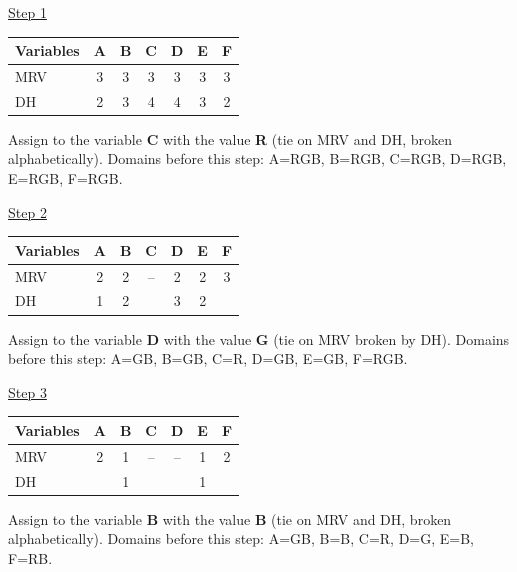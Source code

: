 \documentclass[11pt,a4paper]{article}
\begin{document}
\begin{solbox}
\par \underline{Step 1}\par\begin{center}\small \begin{tabular}{|l|c|c|c|c|c|c|}\hline Variables & \textbf{A} & \textbf{B} & \textbf{C} & \textbf{D} & \textbf{E} & \textbf{F}\\ \hline MRV & \textcolor{blue!60!black}{3} & \textcolor{blue!60!black}{3} & \textcolor{blue!60!black}{3} & \textcolor{blue!60!black}{3} & \textcolor{blue!60!black}{3} & \textcolor{blue!60!black}{3}\\ \hline DH & \textcolor{blue!60!black}{2} & \textcolor{blue!60!black}{3} & \textcolor{blue!60!black}{4} & \textcolor{blue!60!black}{4} & \textcolor{blue!60!black}{3} & \textcolor{blue!60!black}{2}\\ \hline\end{tabular}\end{center}Assign to the variable \textbf{C} with the value \textbf{R} (tie on MRV and DH, broken alphabetically). Domains before this step: A=RGB, B=RGB, C=RGB, D=RGB, E=RGB, F=RGB.\par
\underline{Step 2}\par\begin{center}\small \begin{tabular}{|l|c|c|c|c|c|c|}\hline Variables & \textbf{A} & \textbf{B} & \textbf{C} & \textbf{D} & \textbf{E} & \textbf{F}\\ \hline MRV & \textcolor{blue!60!black}{2} & \textcolor{blue!60!black}{2} & -- & \textcolor{blue!60!black}{2} & \textcolor{blue!60!black}{2} & \textcolor{blue!60!black}{3}\\ \hline DH & \textcolor{blue!60!black}{1} & \textcolor{blue!60!black}{2} &  & \textcolor{blue!60!black}{3} & \textcolor{blue!60!black}{2} & \\ \hline\end{tabular}\end{center}Assign to the variable \textbf{D} with the value \textbf{G} (tie on MRV broken by DH). Domains before this step: A=GB, B=GB, C=R, D=GB, E=GB, F=RGB.\par
\underline{Step 3}\par\begin{center}\small \begin{tabular}{|l|c|c|c|c|c|c|}\hline Variables & \textbf{A} & \textbf{B} & \textbf{C} & \textbf{D} & \textbf{E} & \textbf{F}\\ \hline MRV & \textcolor{blue!60!black}{2} & \textcolor{blue!60!black}{1} & -- & -- & \textcolor{blue!60!black}{1} & \textcolor{blue!60!black}{2}\\ \hline DH &  & \textcolor{blue!60!black}{1} &  &  & \textcolor{blue!60!black}{1} & \\ \hline\end{tabular}\end{center}Assign to the variable \textbf{B} with the value \textbf{B} (tie on MRV and DH, broken alphabetically). Domains before this step: A=GB, B=B, C=R, D=G, E=B, F=RB.\par

\end{solbox}
\end{document}
